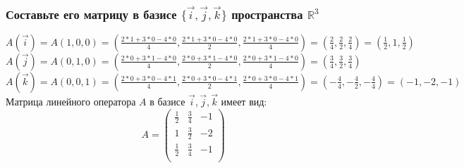 \documentclass{article}
\begin{document}
    \subsubsection{Составьте его матрицу в базисе $\{\overrightarrow{i}, \overrightarrow{j}, \overrightarrow{k}\}$ пространства $\mathbb{R}^3$}
    $A(\overrightarrow{i}) = A(1,0,0) = (\frac{2*1+3*0-4*0}{4}, \frac{2*1+3*0-4*0}{2}, \frac{2*1+3*0-4*0}{4}) = (\frac{2}{4}, \frac{2}{2}, \frac{2}{4}) = (\frac{1}{2}, 1, \frac{1}{2})$\\ 
    $A(\overrightarrow{j}) = A(0,1,0) = (\frac{2*0+3*1-4*0}{4}, \frac{2*0+3*1-4*0}{2}, \frac{2*0+3*1-4*0}{4}) = (\frac{3}{4}, \frac{3}{2}, \frac{3}{4})$\\ 
    $A(\overrightarrow{k}) = A(0,0,1) = (\frac{2*0+3*0-4*1}{4}, \frac{2*0+3*0-4*1}{2}, \frac{2*0+3*0-4*1}{4}) = ( - \frac{4}{4},- \frac{4}{2},- \frac{4}{4}) = (-1, -2, -1)$\\ 
    Матрица линейного оператора $A$ в базисе ${\overrightarrow{i}, \overrightarrow{j}, \overrightarrow{k}}$ имеет вид: \\
        \begin{equation*}
    A = 
        \begin{pmatrix}
            \frac{1}{2}& \frac{3}{4}& -1\\
            1& \frac{3}{2}& -2\\
            \frac{1}{2}& \frac{3}{4}& -1\\
        \end{pmatrix}
    \end{equation*}
    
\end{document}
